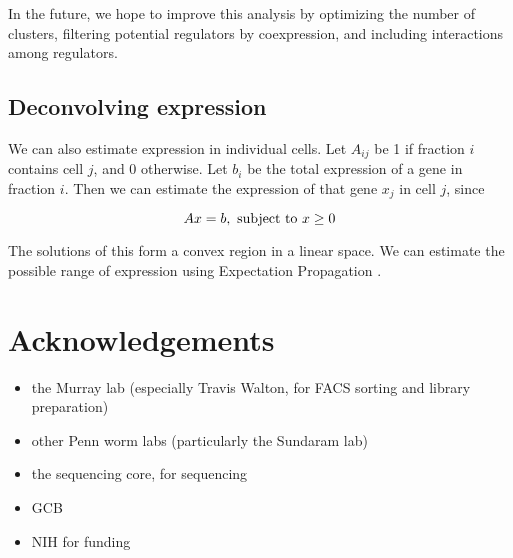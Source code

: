 \documentclass[landscape,a0]{a0poster}
\begin{document}
\begin{multicols}{4}
In the future, we hope to improve this analysis by optimizing the number of clusters,
filtering potential regulators by coexpression, and including interactions among regulators.

\subsection*{Deconvolving expression}

We can also estimate expression in individual cells.
Let $A_{ij}$ be 1 if fraction $i$ contains cell $j$, and 0 otherwise.
Let $b_i$ be the total expression of a gene in fraction $i$.
Then we can estimate the expression of that gene $x_j$ in cell $j$,
since

$$
A x = b, \mbox{ subject to }
x \ge 0 \\
$$

The solutions of this form a convex region in a linear space.
We can estimate the possible range
of expression using Expectation Propagation \cite{minka_expectation_2001}.

\section*{Acknowledgements}

\begin{itemize}

\item the Murray lab (especially
Travis Walton, for FACS sorting and library preparation)

\item other Penn worm labs (particularly the Sundaram lab)

\item the sequencing core, for sequencing

\item GCB

\item NIH for funding

\end{itemize}




\end{multicols}
\end{document}
